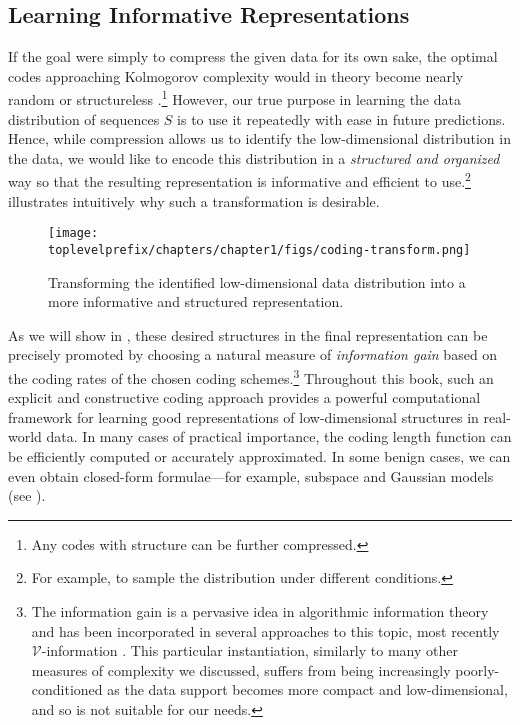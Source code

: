 \documentclass[../../book-main.tex]{subfiles}
\begin{document}
\subsection{Learning Informative Representations}
If the goal were simply to compress the given data for its own sake, the optimal codes approaching Kolmogorov complexity would in theory become nearly random or structureless \cite{Chaitin-1966}.\footnote{Any codes with structure can be further compressed.} However, our true purpose in learning the data distribution of sequences $S$ is to use it repeatedly with ease in future predictions. Hence, while compression allows us to identify the low-dimensional distribution in the data, we would like to encode this distribution in a \textit{structured and organized} way so that the resulting representation is informative and efficient to use.\footnote{For example, to sample the distribution under different conditions.}  illustrates intuitively why such a transformation is desirable.

\begin{figure}
    \centering
    \texttt{[image: \\toplevelprefix/chapters/chapter1/figs/coding-transform.png]}
    \caption{Transforming the identified low-dimensional data distribution into a more informative and structured representation.}
    \label{fig:expansion}
\end{figure}
As we will show in , these desired structures in the final representation can be precisely promoted by choosing a natural measure of \textit{information gain} based on the coding rates of the chosen coding schemes.\footnote{The information gain is a pervasive idea in algorithmic information theory and has been incorporated in several approaches to this topic, most recently \(\mathcal{V}\)-information \cite{xu2020theory}. This particular instantiation, similarly to many other measures of complexity we discussed, suffers from being increasingly poorly-conditioned as the data support becomes more compact and low-dimensional, and so is not suitable for our needs.} Throughout this book, such an explicit and constructive coding approach provides a powerful computational framework for learning good representations of low-dimensional structures in real-world data. In many cases of practical importance, the coding length function can be efficiently computed or accurately approximated. In some benign cases, we can even obtain closed-form formulae---for example, subspace and Gaussian models (see ).
\end{document}
